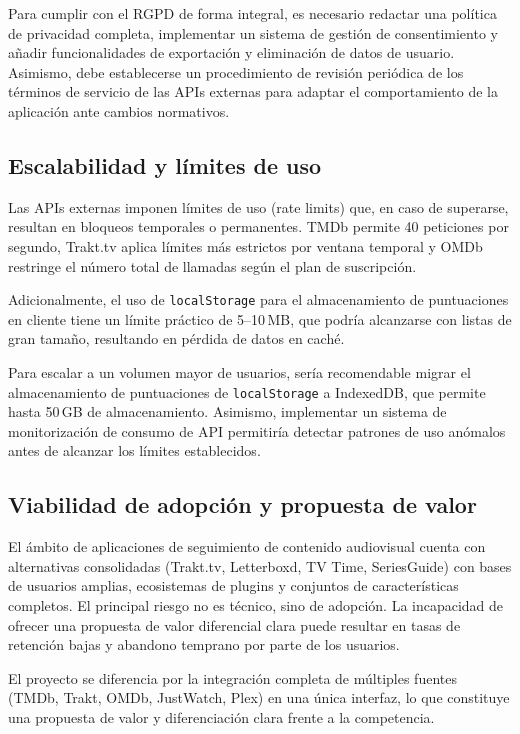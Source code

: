 Para cumplir con el RGPD de forma integral, es necesario redactar una política de privacidad completa, implementar un sistema de gestión de consentimiento y añadir funcionalidades de exportación y eliminación de datos de usuario. Asimismo, debe establecerse un procedimiento de revisión periódica de los términos de servicio de las APIs externas para adaptar el comportamiento de la aplicación ante cambios normativos.

\subsection{Escalabilidad y límites de uso}

Las APIs externas imponen límites de uso (rate limits) que, en caso de superarse, resultan en bloqueos temporales o permanentes. TMDb permite 40 peticiones por segundo, Trakt.tv aplica límites más estrictos por ventana temporal y OMDb restringe el número total de llamadas según el plan de suscripción.

Adicionalmente, el uso de \texttt{localStorage} para el almacenamiento de puntuaciones en cliente tiene un límite práctico de 5--10\,MB, que podría alcanzarse con listas de gran tamaño, resultando en pérdida de datos en caché.

Para escalar a un volumen mayor de usuarios, sería recomendable migrar el almacenamiento de puntuaciones de \texttt{localStorage} a IndexedDB, que permite hasta 50\,GB de almacenamiento. Asimismo, implementar un sistema de monitorización de consumo de API permitiría detectar patrones de uso anómalos antes de alcanzar los límites establecidos.

\subsection{Viabilidad de adopción y propuesta de valor}

El ámbito de aplicaciones de seguimiento de contenido audiovisual cuenta con alternativas consolidadas (Trakt.tv, Letterboxd, TV Time, SeriesGuide) con bases de usuarios amplias, ecosistemas de plugins y conjuntos de características completos. El principal riesgo no es técnico, sino de adopción. La incapacidad de ofrecer una propuesta de valor diferencial clara puede resultar en tasas de retención bajas y abandono temprano por parte de los usuarios.

El proyecto se diferencia por la integración completa de múltiples fuentes (TMDb, Trakt, OMDb, JustWatch, Plex) en una única interfaz, lo que constituye una propuesta de valor y diferenciación clara frente a la competencia.

